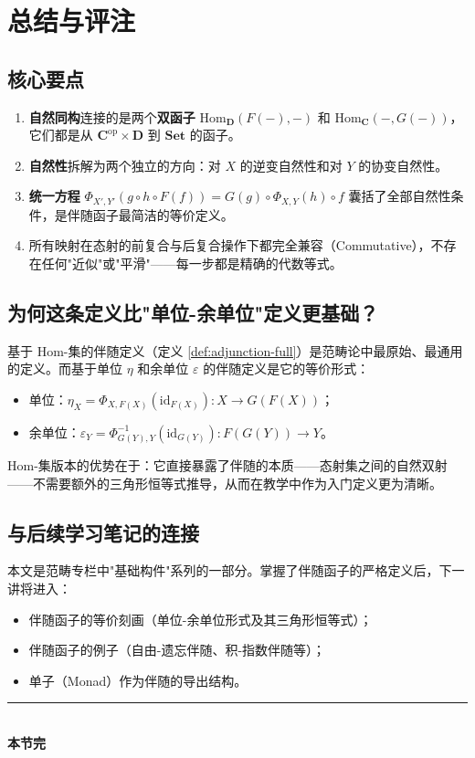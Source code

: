 \documentclass[12pt,a4paper]{ctexart}
\theoremstyle{definition}
\newcommand{\cat}[1]{\mathbf{#1}}
\newcommand{\Set}{\cat{Set}}
\newcommand{\id}{\mathrm{id}}
\newcommand{\Hom}{\mathrm{Hom}}
\begin{document}
\newpage

\section{总结与评注}

\subsection{核心要点}

\begin{enumerate}[nosep]
    \item \textbf{自然同构}连接的是两个\textbf{双函子} $\Hom_{\cat{D}}(F(-), -)$ 和 $\Hom_{\cat{C}}(-, G(-))$，它们都是从 $\cat{C}^{\mathrm{op}} \times \cat{D}$ 到 $\Set$ 的函子。
    \item \textbf{自然性}拆解为两个独立的方向：对 $X$ 的逆变自然性和对 $Y$ 的协变自然性。
    \item \textbf{统一方程} $\Phi_{X',Y'}(g \circ h \circ F(f)) = G(g) \circ \Phi_{X,Y}(h) \circ f$ 囊括了全部自然性条件，是伴随函子最简洁的等价定义。
    \item 所有映射在态射的前复合与后复合操作下都完全兼容（Commutative），不存在任何"近似"或"平滑"——每一步都是精确的代数等式。
\end{enumerate}

\subsection{为何这条定义比"单位-余单位"定义更基础？}

基于 Hom-集的伴随定义（定义 \ref{def:adjunction-full}）是范畴论中最原始、最通用的定义。而基于单位 $\eta$ 和余单位 $\varepsilon$ 的伴随定义是它的等价形式：

\begin{itemize}[nosep]
    \item 单位：$\eta_X = \Phi_{X,F(X)}(\id_{F(X)}): X \to G(F(X))$；
    \item 余单位：$\varepsilon_Y = \Phi_{G(Y),Y}^{-1}(\id_{G(Y)}): F(G(Y)) \to Y$。
\end{itemize}

Hom-集版本的优势在于：它直接暴露了伴随的本质——态射集之间的自然双射——不需要额外的三角形恒等式推导，从而在教学中作为入门定义更为清晰。

\subsection{与后续学习笔记的连接}

本文是范畴专栏中"基础构件"系列的一部分。掌握了伴随函子的严格定义后，下一讲将进入：
\begin{itemize}[nosep]
    \item 伴随函子的等价刻画（单位-余单位形式及其三角形恒等式）；
    \item 伴随函子的例子（自由-遗忘伴随、积-指数伴随等）；
    \item 单子（Monad）作为伴随的导出结构。
\end{itemize}

\vspace{1em}
\begin{center}
\rule{0.5\textwidth}{0.5pt}\\[0.5em]
\textbf{本节完}
\end{center}
\end{document}
